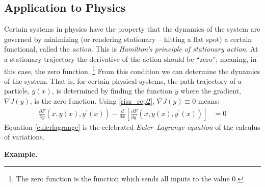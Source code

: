\documentclass{article}
\begin{document}
\subsection{Application to Physics}
Certain systems in physics have the property that the dynamics of the system
are governed by minimizing (or rendering stationary -- hitting a flat spot)
a certain functional, called the {\em action\/}. This is {\em Hamilton's
principle of stationary action\/}. At a stationary trajectory the derivative
of the action should be ``zero''{}; meaning, in this case, the zero function.%
\footnote{The zero function is the function which sends all inputs to the value $0$.}
From this condition we can determine the dynamics of
the system. That is, for certain physical systems, the path trajectory of a particle,
$y(x)$, is determined by finding the function $y$ where the gradient,
$\nabla J(y)$, is the zero function. Using \eqref{risz_rep2}, $\nabla J(y) \equiv 0$
means:
\begin{align}
  \frac{\partial F}{\partial y}(x, y(x), y^\prime(x))
  - \frac{d}{dx} \left[ \frac{\partial F}{\partial y^\prime}(x, y(x), y^\prime(x))\right] &= 0 \label{eulerlagrange}
\end{align}
Equation \eqref{eulerlagrange} is the celebrated {\em Euler--Lagrange
equation\/} of the calculus of variations.

{\bf Example.}
\end{document}
